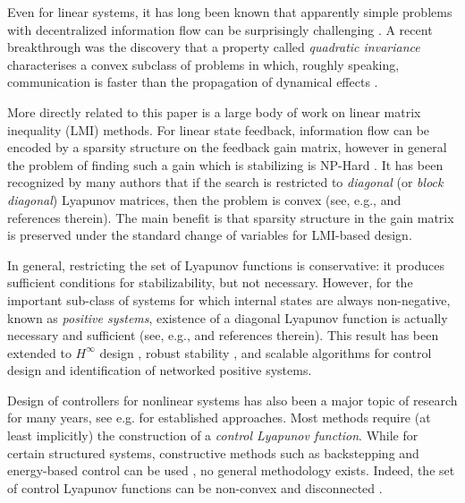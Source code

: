 \documentclass[10pt,twocolumn,twoside]{IEEEtran}
\newcounter{para}
\newcommand\mypara{\par}
\theoremstyle{plain}
\theoremstyle{definition}
\theoremstyle{remark}
\begin{document}
\mypara Even for linear systems, it has long been known that apparently simple problems with decentralized information flow can be surprisingly challenging \cite{witsenhausen_counterexample_1968}. A recent breakthrough was the discovery that a property called {\em quadratic invariance} characterises a convex subclass of problems in which, roughly speaking, communication is faster than the propagation of dynamical effects \cite{rotkowitz_characterization_2006}.
%

\mypara More directly related to this paper is a large body of work on linear matrix inequality (LMI) methods. For linear state feedback, information flow can be encoded by a sparsity structure on the feedback gain matrix, however in general the problem of finding such a gain which is stabilizing is NP-Hard \cite{BlondelTsitsiklis1997}. It has been recognized by many authors that if the search is restricted to {\em diagonal} (or {\em block diagonal}) Lyapunov matrices, then the problem is convex (see, e.g., \cite{zecevic_control_2010, Tanaka2011, Rantzer2015} and references therein). The main benefit is that sparsity structure in the gain matrix is preserved under the standard change of variables for LMI-based design.

\mypara In general, restricting the set of Lyapunov functions is conservative: it produces sufficient conditions for stabilizability, but not necessary. However, for the important sub-class of systems for which internal states are always  non-negative, known as {\em positive systems}, existence of a diagonal Lyapunov function is actually necessary and sufficient
(see, e.g., \cite{berman_nonnegative_1994} and references therein). This result has been extended to $H^\infty$ design \cite{Tanaka2011}, robust stability \cite{colombino_convex_2016}, and scalable algorithms for control design \cite{Rantzer2015} and identification \cite{umenberger_scalable_2016} of networked positive systems.

\mypara Design of controllers for nonlinear systems has also been a major topic of research for many years, see e.g. \cite{Slotine1991,Krstic1995, Sontag1998, Khalil:2001} for established approaches.
Most methods require (at least implicitly) the construction of a \emph{control Lyapunov function}. While for certain structured systems, constructive methods such as backstepping and energy-based control can be used \cite{Slotine1991, Krstic1995}, no general methodology exists. Indeed, the set of control Lyapunov functions can be non-convex and disconnected \cite{Rantzer:2001}. 
\end{document}
